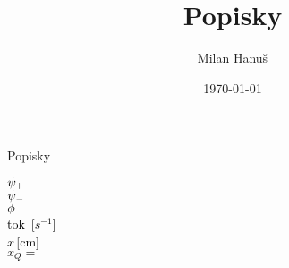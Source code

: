 \documentclass{beamer}
\title{Popisky}
\author{Milan Hanuš}
\date{\today}
\begin{document}
	
	\begin{frame}{Popisky}
	\begin{center}
	{
	\LARGE
	\textcolor{red}{$\psi_+$}\\[1em]
	\textcolor{green}{$\psi_-$}\\[1em]
	\textcolor{blue}{$\phi$}\\[1em]
	}
	{
	\large
	\textcolor{black}{tok\, [$s^{-1}$]}\\[1em]
	\textcolor{black}{$x$\,[cm]}\\[1em]
	\textcolor{black}{$x_Q = $}
	}
	\end{center}
	\end{frame}
	
\end{document}
